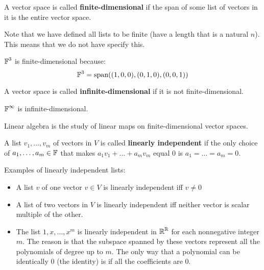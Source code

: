 \begin{definition}
    A vector space is called \textbf{finite-dimensional} if the span of some
    list of vectors in it is the entire vector space.
\end{definition}

Note that we have defined all lists to be finite (have a length that is a natural $n$).
This means that we do not have specify this.

\begin{example}
    $\operatorname{\mathbb{F}}^3$ is finite-dimensional because:
    \[ \operatorname{\mathbb{F}}^3 = \text{span} ((1, 0, 0), (0, 1, 0), (0, 0, 1))\]
\end{example}

\begin{definition}
    A vector space is called \textbf{infinite-dimensional} if it is not finite-dimensional.
\end{definition}

\begin{example}
    $\operatorname{\mathbb{F}}^{\infty}$ is infinite-dimensional.
\end{example}

Linear algebra is the study of linear maps on finite-dimensional vector spaces.

\begin{definition}
    A list $v_1, \ldots, v_m$ of vectors in $V$ is called \textbf{linearly independent}
    if the only choice of $a_1, \ldots, a_m \in \operatorname{\mathbb{F}}$ that makes $a_1 v_1 + \dots + a_m v_m$ equal 0 is
    $a_1 = \dots = a_m = 0$.
\end{definition}

\begin{example}
    Examples of linearly independent lists:
    \begin{itemize}
        \item A list $v$ of one vector $v \in V$ is linearly independent iff $v \neq 0$
        \item A list of two vectors in $V$ is linearly independent iff neither
        vector is scalar multiple of the other.
        \item The list $1, x, \dots, x^m$ is linearly independent in $\operatorname{\mathbb{R}}^{\operatorname{\mathbb{R}}}$ for
        each nonnegative integer $m$. The reason is that the subspace spanned by these vectors
        represent all the polynomials of degree up to $m$. The only way that a polynomial can be 
        identically 0 (the identity) is if all the coefficients are 0.
    \end{itemize}
\end{example}

